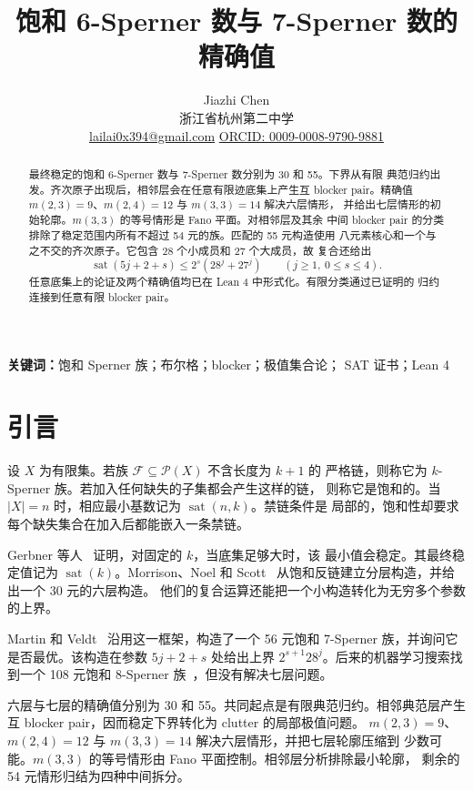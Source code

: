 \documentclass[UTF8,11pt,a4paper,fontset=fandol]{ctexart}
\title{饱和 6-Sperner 数与 7-Sperner 数的精确值}
\author{Jiazhi Chen\\
\small 浙江省杭州第二中学\\
\small \href{mailto:lailai0x394@gmail.com}{lailai0x394@gmail.com}\quad
\href{https://orcid.org/0009-0008-9790-9881}{ORCID: 0009-0008-9790-9881}}
\date{}
\theoremstyle{definition}
\theoremstyle{remark}
\newcommand{\powerset}{\mathcal{P}}
\newcommand{\family}{\mathcal{F}}
\newcommand{\sat}{\operatorname{sat}}
\begin{document}
\pagestyle{plain}
\maketitle

\begin{abstract}
最终稳定的饱和 6-Sperner 数与 7-Sperner 数分别为 30 和 55。下界从有限
典范归约出发。齐次原子出现后，相邻层会在任意有限迹底集上产生互 blocker
pair。精确值 $m(2,3)=9$、$m(2,4)=12$ 与 $m(3,3)=14$ 解决六层情形，
并给出七层情形的初始轮廓。$m(3,3)$ 的等号情形是 Fano 平面。对相邻层及其余
中间 blocker pair 的分类排除了稳定范围内所有不超过 54 元的族。匹配的 55 元构造使用
八元素核心和一个与之不交的齐次原子。它包含 28 个小成员和 27 个大成员，故
复合还给出
\[
  \sat(5j+2+s)\leq 2^s(28^j+27^j)
  \qquad(j\geq1,\ 0\leq s\leq4).
\]
任意底集上的论证及两个精确值均已在 Lean 4 中形式化。有限分类通过已证明的
归约连接到任意有限 blocker pair。
\end{abstract}

\noindent\textbf{关键词：}饱和 Sperner 族；布尔格；blocker；极值集合论；
SAT 证书；Lean 4

\section{引言}

设 $X$ 为有限集。若族 $\family\subseteq\powerset(X)$ 不含长度为 $k+1$ 的
严格链，则称它为 $k$-Sperner 族。若加入任何缺失的子集都会产生这样的链，
则称它是饱和的。当 $|X|=n$ 时，相应最小基数记为 $\sat(n,k)$。禁链条件是
局部的，饱和性却要求每个缺失集合在加入后都能嵌入一条禁链。

Gerbner 等人~\cite{gerbner2013} 证明，对固定的 $k$，当底集足够大时，该
最小值会稳定。其最终稳定值记为 $\sat(k)$。Morrison、Noel 和
Scott~\cite{mns2014} 从饱和反链建立分层构造，并给出一个 30 元的六层构造。
他们的复合运算还能把一个小构造转化为无穷多个参数的上界。

Martin 和 Veldt~\cite{martinveldt2025} 沿用这一框架，构造了一个 56 元饱和
7-Sperner 族，并询问它是否最优。该构造在参数 $5j+2+s$ 处给出上界
$2^{s+1}28^j$。后来的机器学习搜索找到一个 108 元饱和 8-Sperner
族~\cite{patternboost}，但没有解决七层问题。

六层与七层的精确值分别为 30 和 55。共同起点是有限典范归约。相邻典范层产生
互 blocker pair，因而稳定下界转化为 clutter 的局部极值问题。
$m(2,3)=9$、$m(2,4)=12$ 与 $m(3,3)=14$ 解决六层情形，并把七层轮廓压缩到
少数可能。$m(3,3)$ 的等号情形由 Fano 平面控制。相邻层分析排除最小轮廓，
剩余的 54 元情形归结为四种中间拆分。
\end{document}
